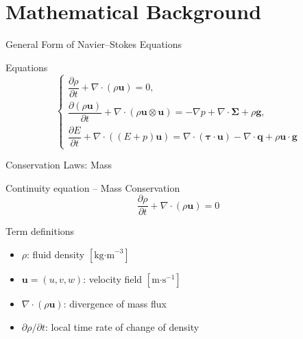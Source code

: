 \section{Mathematical Background}


\begin{secframe}
\small
\textcolor{red_unipd}{\Large General Form of Navier--Stokes Equations}

\vspace{0.6em}

\begin{alertblock}{Equations}
\[
\begin{cases}
\dfrac{\partial \rho}{\partial t}
+ \nabla\!\cdot\!(\rho \mathbf{u}) = 0,\\[16pt]

\dfrac{\partial (\rho \mathbf{u})}{\partial t}
+ \nabla\!\cdot\!(\rho \mathbf{u} \otimes \mathbf{u})
= -\nabla p + \nabla\!\cdot\!\boldsymbol{\Sigma} + \rho \mathbf{g},\\[16pt]

\dfrac{\partial E}{\partial t}
+ \nabla\!\cdot\!((E+p)\mathbf{u})
= \nabla\!\cdot\!(\boldsymbol{\tau}\!\cdot\!\mathbf{u})
- \nabla\!\cdot\!\mathbf{q} + \rho \mathbf{u}\!\cdot\!\mathbf{g}
\end{cases}
\]
\end{alertblock}

\end{secframe}




\begin{secframe}
\small
\textcolor{red_unipd}{\Large Conservation Laws: Mass}

\vspace{0.8em}

\begin{alertblock}{Continuity equation -- Mass Conservation}
\[
\dfrac{\partial \rho}{\partial t} + \nabla\!\cdot\!(\rho \mathbf{u}) = 0
\]
\end{alertblock}

\begin{block}{Term definitions}
\begin{itemize}
  \item \(\rho\): fluid density \([\text{kg·m}^{-3}]\)
  \item \(\mathbf{u} = (u,v,w)\): velocity field \([\text{m·s}^{-1}]\)
  \item \(\nabla\!\cdot\!(\rho \mathbf{u})\): divergence of mass flux
  \item \(\partial \rho / \partial t\): local time rate of change of density
\end{itemize}
\end{block}
\end{secframe}




